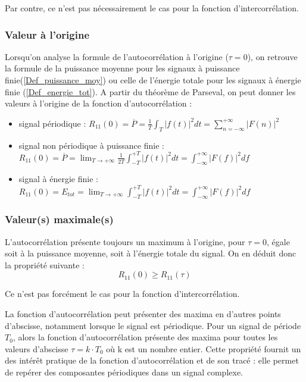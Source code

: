 	Par contre, ce n'est pas nécessairement le cas pour la fonction d'intercorrélation.
	
	\subsubsection{Valeur à l'origine}
	Lorsqu'on analyse la formule de l'autocorrélation à l'origine ($\tau=0$), on retrouve la formule de la puissance moyenne pour les signaux à puissance finie(\ref{Def_puissance_moy}) ou celle de l'énergie totale pour les signaux à énergie finie (\ref{Def_energie_tot}). A partir du théorème de Parseval, on peut donner les valeurs à l'origine de la fonction d'autocorrélation :
	
	\begin{itemize}
		\item signal périodique : $R_{11}(0)=\overline{P}=\frac{1}{T}\int_{T}|f(t)|^{2}dt=\sum_{n=-\infty}^{+\infty}|F(n)|^{2}$
		\item  signal non périodique à puissance finie : $R_{11}(0)=\overline{P}=\lim_{T \to +\infty}\frac{1}{2T}\int_{-T}^{+T}|f(t)|^{2}dt=\int_{-\infty}^{+\infty}|F(f)|^{2}df$
		\item signal à énergie finie : $R_{11}(0)= E_{tot}=\lim_{T \to +\infty}\int_{-T}^{+T}|f(t)|^{2}dt=\int_{-\infty}^{+\infty}|F(f)|^{2}df$		
	\end{itemize}


	\subsubsection{Valeur(s) maximale(s)}
	
	L'autocorrélation présente toujours un maximum à l'origine, pour $\tau = 0$, égale soit à la puissance moyenne, soit à l'énergie totale du signal.  On en déduit donc la propriété suivante :
	\begin{equation}\label{key}
	R_{11}(0) \geq R_{11}(\tau)
	\end{equation}
	
	Ce n'est pas forcément le cas pour la fonction d'intercorrélation.
	 
	La fonction d'autocorrélation peut présenter des maxima en d'autres points d'abscisse, notamment lorsque le signal est périodique. Pour un signal de période $T_{0}$, alors la fonction d'autocorrélation présente des maxima pour toutes les valeurs d'abscisse $\tau = k\cdot T_{0}$ où k est un nombre entier. Cette propriété fournit un des intérêt pratique de la fonction d'autocorrélation et de son tracé : elle permet de repérer des composantes périodiques dans un signal complexe. 
	
